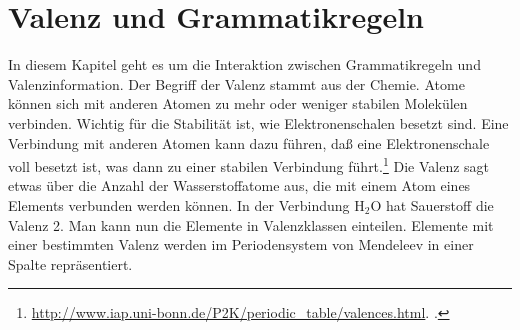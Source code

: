 
\chapter{Valenz und Grammatikregeln}
\label{chap-valenz}

In diesem Kapitel geht es um die Interaktion zwischen Grammatikregeln und Valenzinformation.
Der Begriff der Valenz stammt aus der Chemie. Atome können sich mit anderen Atomen
zu mehr oder weniger stabilen Molekülen verbinden. Wichtig für die Stabilität ist, wie
Elektronenschalen besetzt sind. Eine Verbindung mit anderen Atomen kann dazu führen,
daß eine Elektronenschale voll besetzt ist, was dann zu einer stabilen Verbindung führt.\footnote{
\url{http://www.iap.uni-bonn.de/P2K/periodic_table/valences.html}. .%
}
Die Valenz sagt etwas über die Anzahl der Wasserstoffatome aus,
die mit einem Atom eines Elements verbunden werden können. In der Verbindung H$_2$O
hat Sauerstoff die Valenz 2. Man kann nun die Elemente in Valenzklassen einteilen.
Elemente mit einer bestimmten Valenz werden im Periodensystem von Mendeleev
in einer Spalte repräsentiert.

